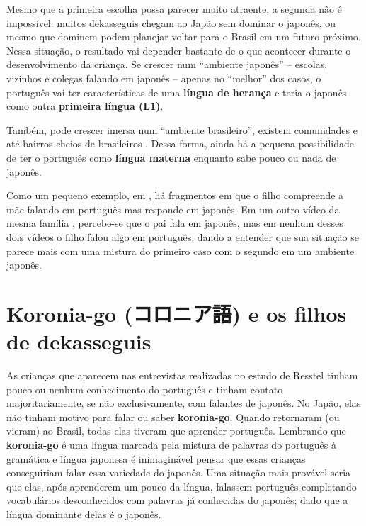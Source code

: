 \documentclass{article}
\newcommand{\jap}[1]{#1}
\newcommand{\keyword}[1]{\textbf{#1}}
\newcommand{\koroniago}{\jap{コロニア語}}
\newcommand{\koronia}{\keyword{koronia-go}}
\begin{document}
Mesmo que a primeira escolha possa parecer muito atraente,
a segunda não é impossível:
muitos dekasseguis chegam ao Japão sem dominar o japonês,
ou mesmo que dominem podem planejar voltar para o Brasil
em um futuro próximo.
Nessa situação, o resultado vai depender bastante
de o que acontecer durante o desenvolvimento da criança.
Se crescer num ``ambiente japonês''
-- escolas, vizinhos e colegas falando em japonês --
apenas no ``melhor'' dos casos,
o português vai ter características de uma
\keyword{língua de herança} e
teria o japonês como outra \keyword{primeira língua (L1)}.

Também, pode crescer imersa num ``ambiente brasileiro'',
existem comunidades e até bairros cheios de brasileiros
\cite{japaoimigrantesbrasileiros} \cite{escolasbrjp}
\cite{regioesmaisbrjp}
\cite{videobairrojpcarla} \cite{videobairrojpfernando}
\cite{videocidadebr}.
Dessa forma, ainda há a pequena possibilidade de
ter o português como \keyword{língua materna}
enquanto sabe pouco ou nada de japonês.

Como um pequeno exemplo,
em \cite{videobairrojpcarla},
há fragmentos em que o filho compreende a mãe falando
em português mas responde em japonês.
Em um outro vídeo da mesma família \cite{videoramencarla},
percebe-se que o pai fala em japonês,
mas em nenhum desses dois vídeos
o filho falou algo em português,
dando a entender que sua situação
se parece mais com uma mistura do primeiro caso
com o segundo em um ambiente japonês.

\section{Koronia-go (\koroniago{}) e os filhos de dekasseguis}

As crianças que aparecem nas entrevistas
realizadas no estudo de Resstel \cite{filhosdekasegi}
tinham pouco ou nenhum conhecimento do português e
tinham contato majoritariamente, se não exclusivamente,
com falantes de japonês.
No Japão, elas não tinham motivo para falar ou saber \koronia{}.
Quando retornaram (ou vieram) ao Brasil,
todas elas tiveram que aprender português.
Lembrando que \koronia{} é uma língua marcada pela
mistura de palavras do português à gramática e língua japonesa
é inimaginável pensar que essas crianças conseguiriam falar
essa variedade do japonês.
Uma situação mais provável seria
que elas,
após aprenderem um pouco da língua,
falassem português
completando vocabulários desconhecidos
com palavras já conhecidas do japonês;
dado que a língua dominante delas é o japonês.

\newpage

\nocite{*}


\end{document}
